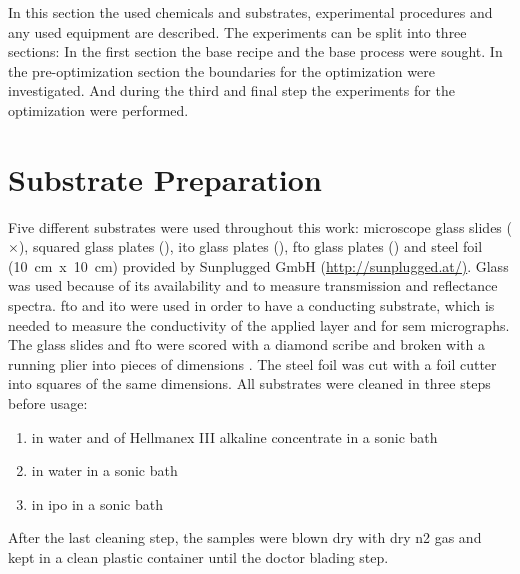 In this section the used chemicals and substrates, experimental procedures and any used 
equipment are described. 
The experiments can be split into three sections: 
In the first section the base recipe and the base process were sought. 
In the pre-optimization section the boundaries for the optimization were investigated. 
And during the third and final step the experiments for the optimization were performed.
\section{Substrate Preparation}
Five different substrates were used throughout this work: 
microscope glass slides 
\linebreak[4] 
($\times$), 
squared glass plates (\x{}), 
\gls{ito} glass plates (\x{}), 
\gls{fto} glass plates (\x{}) and steel foil (10~cm~x~10~cm) provided by Sunplugged GmbH (\url{http://sunplugged.at/)}.
%
Glass was used because of its availability and to measure transmission and reflectance 
spectra. \gls{fto} and \gls{ito} were used in order to have a conducting substrate, which
is needed to measure the conductivity of the applied layer and for \gls{sem} micrographs.
The glass slides and \gls{fto} were scored with a diamond scribe and broken with a running plier into pieces of dimensions \x{}.
The steel foil was cut with a foil cutter into squares of the same dimensions. 
All substrates were cleaned in three steps before usage:
\begin{enumerate}
	\item {} in  \gls{water} and  of Hellmanex III alkaline concentrate in a sonic bath
	\item {} in \gls{water} in a sonic bath
	\item {} in \gls{ipo} in a sonic bath 
\end{enumerate}
After the last cleaning step, the samples were blown dry with dry \gls{n2} gas and kept in a clean plastic container until the doctor blading step.

